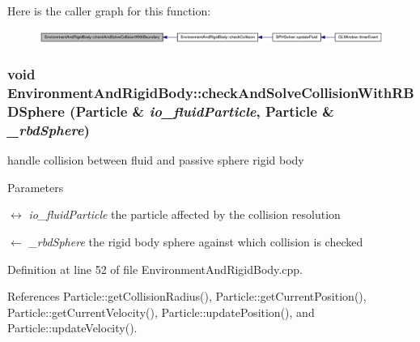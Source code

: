 Here is the caller graph for this function:\nopagebreak
\begin{figure}[H]
\begin{center}
\leavevmode
\includegraphics[width=420pt]{class_environment_and_rigid_body_ad2f2263fff1ed7f94bb920b7970bdfa3_icgraph}
\end{center}
\end{figure}


\hypertarget{class_environment_and_rigid_body_acfad78cb6ae8ab9d7fb04479c98a618e}{
\subsubsection[{checkAndSolveCollisionWithRBDSphere}]{\setlength{\rightskip}{0pt plus 5cm}void EnvironmentAndRigidBody::checkAndSolveCollisionWithRBDSphere ({\bf Particle} \& {\em io\_\-fluidParticle}, \/  {\bf Particle} \& {\em \_\-rbdSphere})}}
\label{class_environment_and_rigid_body_acfad78cb6ae8ab9d7fb04479c98a618e}


handle collision between fluid and passive sphere rigid body 


\begin{DoxyParams}{Parameters}
\item[\mbox{$\leftrightarrow$} {\em io\_\-fluidParticle}]the particle affected by the collision resolution \item[\mbox{$\leftarrow$} {\em \_\-rbdSphere}]the rigid body sphere against which collision is checked \end{DoxyParams}


Definition at line 52 of file EnvironmentAndRigidBody.cpp.



References Particle::getCollisionRadius(), Particle::getCurrentPosition(), Particle::getCurrentVelocity(), Particle::updatePosition(), and Particle::updateVelocity().




